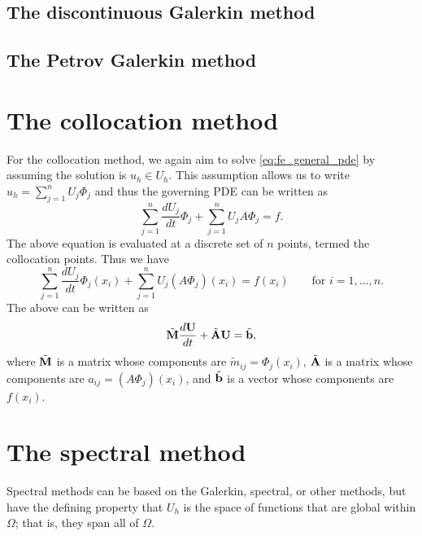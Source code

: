\documentclass[oneside,a4paper,11pt]{report}
\begin{document}
\subsection{The discontinuous Galerkin method}

\subsection{The Petrov Galerkin method}

\section{The collocation method}
For the collocation method, we again aim to solve \cref{eq:fe_general_pde} by assuming the solution is $u_h \in U_h$. This assumption allows us to write $u_h= \sum_{j=1}^n U_j \Phi_j$ and thus the governing PDE can be written as
\begin{equation}
    \sum_{j=1}^n \frac{dU_j}{dt} \Phi_j + \sum_{j=1}^n U_j A\Phi_j = f.
\end{equation}
The above equation is evaluated at a discrete set of $n$ points, termed the collocation points. Thus we have
\begin{equation}
    \sum_{j=1}^n \frac{dU_j}{dt} \Phi_j(x_i) + \sum_{j=1}^n U_j (A\Phi_j)(x_i) = f(x_i) \qquad \text{for }i=1,...,n.
\end{equation}
The above can be written as
\begin{equation}
    \tilde{\mathbf{M}} \frac{d \mathbf{U}}{dt} + \tilde{\mathbf{A}} \mathbf{U} = \tilde{\mathbf{b}},
\end{equation}
where $\tilde{\mathbf{M}}$ is a matrix whose components are $\tilde{m}_{ij} = \Phi_j(x_i)$, $\tilde{\mathbf{A}}$ is a matrix whose components are $a_{ij} = (A\Phi_j)(x_i)$, and $\tilde{\mathbf{b}}$ is a vector whose components are $f(x_i)$.

\section{The spectral method}
Spectral methods can be based on the Galerkin, spectral, or other methods, but have the defining property that $U_h$ is the space of functions that are global within $\Omega$; that is, they span all of $\Omega$.
\end{document}
